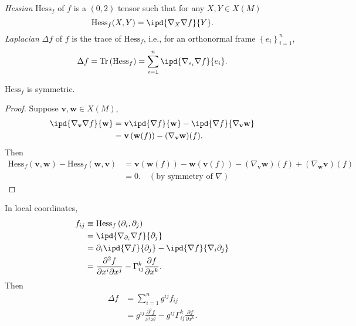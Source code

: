 \begin{definition}
  \textit{Hessian} $\mathrm{Hess}_f$ of $f$ is a $(0,2)$ tensor such that for any $X,Y\in X(M)$ 
  \begin{equation}
    \mathrm{Hess}_f(X,Y)=\ipd{\nabla _X\nabla f}{Y}.
  \end{equation}
  \textit{Laplacian} $\Delta f$ of $f$ is the trace of $\mathrm{Hess}_f$, i.e., for an orthonormal frame $\left\{e_i\right\} _{i=1}^n$,
  \begin{equation}
    \Delta f=\mathrm{Tr}\left( \mathrm{Hess}_f \right) =\sum_{i=1}^{n} \ipd{\nabla _{e_i}\nabla f}{e_i}.
  \end{equation}
\end{definition}
\begin{lemma}
  $\mathrm{Hess}_f$ is symmetric.
\end{lemma}
\begin{proof}
  Suppose $\mathbf{v},\mathbf{w}\in X(M)$,
  \begin{align*}
    \ipd{\nabla _{\mathbf{v}}\nabla f}{\mathbf{w}}&= \mathbf{v}\ipd{\nabla f}{\mathbf{w}}-\ipd{\nabla f}{\nabla _{\mathbf{v}}\mathbf{w}}\\
    &=\mathbf{v}\left( \mathbf{w}(f) \right) -(\nabla _{\mathbf{v}}\mathbf{w})(f)
  .\end{align*}
  Then 
  \begin{align*}
    \mathrm{Hess}_f(\mathbf{v},\mathbf{w})-\mathrm{Hess}_f(\mathbf{w},\mathbf{v})&= \mathbf{v}\left( \mathbf{w}(f) \right) -\mathbf{w}\left( \mathbf{v}(f) \right) -\left( \nabla _{\mathbf{v}}\mathbf{w} \right) (f)+\left( \nabla _{\mathbf{w}}\mathbf{v} \right) (f)\\
    &=0. \quad \left( \text{by symmetry of }\nabla  \right) 
 \end{align*}
\end{proof}
In local coordinates, 
\begin{align*}
  f_{ij}&\equiv \mathrm{Hess}_f\left( \partial_i,\partial_j \right) \\
  &= \ipd{\nabla _{\partial_i}\nabla f}{\partial_j}\\
  &= \partial_i \ipd{\nabla f}{\partial_j}-\ipd{\nabla f}{\nabla _i \partial_j}\\
  &= \frac{\partial ^2 f}{\partial x^i\partial x^j} -\Gamma^k_{ij} \frac{\partial f}{\partial x^k} 
.\end{align*}
Then 
\begin{align*}
  \Delta f&=\sum_{i=1}^{n} g^{ij}f_{ij}\\
  &= g^{ij} \frac{\partial^2 f}{x^ix^j}-g^{ij} \Gamma^k_{ij} \frac{\partial f}{\partial x^k}
.\end{align*}
